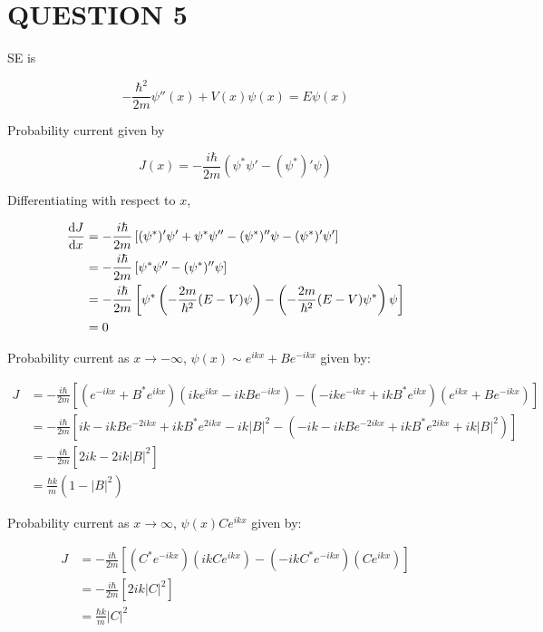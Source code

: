 \documentclass[a4paper]{article}
\begin{document}
\section{QUESTION 5}

SE is

\[ - \frac{\hbar^{2}}{2m} \psi''(x) + V(x) \psi(x) = E \psi(x) \]

Probability current given by

\[ J(x) = - \frac{i \hbar }{2m} (\psi^{*} \psi' - (\psi^{*})' \psi )  \]

Differentiating with respect to $ x $,

\begin{align*}
\frac{\mathrm{d} J}{\mathrm{d} x}  & = - \frac{i \hbar }{2m}\left[ (\psi^{*})'\psi' + \psi^{*} \psi'' - (\psi^{*})'' \psi - (\psi^{*})' \psi'  \right]     \\
& =  - \frac{i \hbar }{2m}\left[ \psi^{*} \psi'' - (\psi^{*})'' \psi \right]     \\
& = - \frac{i \hbar }{2m}\left[ \psi^{*} \left(  - \frac{2m}{\hbar^{2}}(E - V) \psi \right)  - \left(  - \frac{2m}{\hbar^{2}}(E - V) \psi^{*} \right) \psi \right] \\
& = 0
\end{align*}

Probability current as $ x \to - \infty $, $ \psi(x) \sim e^{ikx} + Be^{-ikx} $ given by:

\begin{align*}
J & = - \frac{i \hbar }{2m} \left[   ( e^{-ikx} + B^{*} e^{ikx} )(ik e^{ikx} - i k B e^{-ikx}  )       - ( - i k e^{-i k x} + i k B^{*} e^{ikx}    )   ( e^{ikx} + Be^{-ikx}) \right] \\
& = - \frac{i \hbar }{2m} \left[  ik - ikBe^{-2ikx} + ikB^{*} e^{2ikx} - i k | B |^{2}  - \left(  - ik - ik B e^{-2ikx} + i k B^{*} e^{2ikx} + i k | B |^{2}     \right)    \right] \\
& = - \frac{i \hbar }{2m} \left[  2ik  - 2i k | B |^{2}    \right] \\
& =  \frac{\hbar k}{m} ( 1  - | B |^{2} )
\end{align*}

Probability current as $ x \to \infty $, $ \psi(x) C e^{ikx} $ given by:

\begin{align*}
J & = - \frac{i \hbar }{2m} \left[   (C^{*} e^{-ikx}  )(ik C e^{ikx}  )   - ( - i k C^{*} e^{-i k x})(C e^{ikx})  \right] \\
& = - \frac{i \hbar }{2m} \left[ 2ik | C |^{2}  \right] \\
& = \frac{\hbar k}{m} | C |^{2} 
\end{align*}
\end{document}
